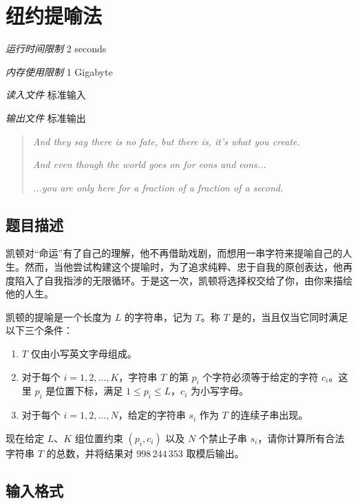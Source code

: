 \section[A. 纽约提喻法]{ 纽约提喻法}

\textit{运行时间限制}   2 seconds

\textit{内存使用限制} 1 Gigabyte

\textit{读入文件} \qquad 标准输入

\textit{输出文件} \qquad 标准输出


\begin{quote}
	\textit{And they say there is no fate, but there is, it's what you create.}

	\textit{And even though the world goes on for eons and eons...}

	\textit{...you are only here for a fraction of a fraction of a second.}
\end{quote}

\subsection{题目描述}

凯顿对``命运''有了自己的理解，他不再借助戏剧，而想用一串字符来提喻自己的人生。然而，当他尝试构建这个提喻时，为了追求纯粹、忠于自我的原创表达，他再度陷入了自我指涉的无限循环。于是这一次，凯顿将选择权交给了你，由你来描绘他的人生。

凯顿的提喻是一个长度为 $L$ 的字符串，记为 $T$。称 $T$ 是的，当且仅当它同时满足以下三个条件：

\begin{enumerate}
	\item $T$ 仅由小写英文字母组成。
	\item 对于每个 $i = 1, 2, \ldots, K$，字符串 $T$ 的第 $p_i$ 个字符必须等于给定的字符 $c_i$。这里 $p_i$ 是位置下标，满足 $1 \le p_i \le L$，$c_i$ 为小写字母。
	\item 对于每个 $i = 1, 2, \ldots, N$，给定的字符串 $s_i$ 作为 $T$ 的连续子串出现。
\end{enumerate}

现在给定 $L$、$K$ 组位置约束 $(p_i, c_i)$ 以及 $N$ 个禁止子串 $s_i$，请你计算所有合法字符串 $T$ 的总数，并将结果对 $998\,244\,353$ 取模后输出。

\subsection{输入格式}

